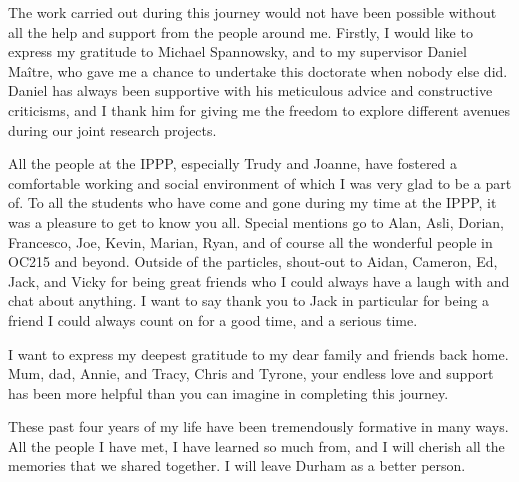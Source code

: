 \documentclass[twoside,openright,frontopenright]{ip3thesis}
\begin{document}
\begin{acknowledgements*}
%
	The work carried out during this journey would not have been
	possible without all the help and support from the people around me.
	Firstly, I would like to express my gratitude to Michael Spannowsky, and
	to my supervisor Daniel Ma\^{i}tre, who gave me a chance to undertake this
	doctorate when nobody else did.
	Daniel has always been supportive with his meticulous advice and constructive criticisms,
	and I thank him for giving me the freedom to explore different avenues during our joint research projects.
	
	All the people at the IPPP, especially Trudy and Joanne, have fostered a comfortable working
	and social environment of which I was very glad to be a part of.
	To all the students who have come and gone during my time at the IPPP, it was a pleasure
	to get to know you all. Special mentions go to Alan, Asli, Dorian, Francesco, Joe, Kevin, Marian,
	Ryan, and of course all the wonderful people in OC215 and beyond.
	Outside of the particles, shout-out to Aidan, Cameron, Ed, Jack, and Vicky for being great friends
	who I could always have a laugh with and chat about anything. I want to say thank you to Jack
	in particular for being a friend I could always count on for a good time, and a serious time.
	
	I want to express my deepest gratitude to my dear family and friends back home. Mum, dad, Annie,
	and Tracy, Chris and Tyrone, your endless love and support has been more helpful than you can imagine
	in completing this journey.

	These past four years of my life have been tremendously formative in many ways. All the people
	I have met, I have learned so much from, and I will cherish all
	the memories that we shared together. I will leave Durham as a better person.
%
\end{acknowledgements*}

\cleardoublepage










\appendix


%



\end{document}
